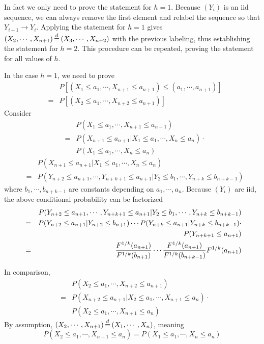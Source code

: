 \documentclass{report}
\begin{document}
\begin{enumerate}[1.]
\begin{enumerate}[(a)]
    In fact we only need to prove the statement for $h=1$. Because
    $(Y_i)$ is an iid sequence, we can always remove the first element
    and relabel the sequence so that $Y_{i+1} \to Y_{i}$. Applying the
    statement for $h=1$ gives $(X_2, \cdots, X_{n+1}) \ed (X_{3},
    \cdots, X_{n+2})$ with the previous labeling, thus establishing
    the statement for $h=2$. This procedure can be repeated, proving
    the statement for all values of $h$.

    In the case $h=1$, we need to prove
    \begin{eqnarray*}
      && P\left[(X_1 \le a_1, \cdots, X_{n+1} \le a_{n+1}) \le (a_1,
        \cdots, a_{n+1}) \right] \\
      &=& P\left[(X_2 \le a_1, \cdots, X_{n+2} \le a_{n+1}) \right]
    \end{eqnarray*}
    Consider
    \begin{eqnarray*}
      && P(X_1 \le a_1, \cdots, X_{n+1} \le a_{n+1}) \\
      &=& P(X_{n+1} \le a_{n+1} | X_1 \le a_1, \cdots, X_{n} \le
      a_{n}) \cdot \\
      && P(X_1 \le a_1, \cdots, X_{n} \le a_{n})
    \end{eqnarray*}
    \begin{eqnarray*}
      && P(X_{n+1} \le a_{n+1} | X_1 \le a_1, \cdots, X_{n} \le
      a_{n}) \\
      &=& P(Y_{n+2} \le a_{n+1}, \cdots, Y_{n+k+1} \le a_{n+1} | Y_2
      \le b_1, \cdots, Y_{n+k} \le b_{n+k-1})
    \end{eqnarray*}
    where $b_1, \cdots, b_{n+k-1}$ are constants depending on $a_1,
    \cdots, a_n$. Because $(Y_i)$ are iid, the above conditional
    probability can be factorized
    \begin{eqnarray*}
      && P(Y_{n+2} \le a_{n+1}, \cdots, Y_{n+k+1} \le a_{n+1} | Y_2
      \le b_1, \cdots, Y_{n+k} \le b_{n+k-1}) \\
      &=& P(Y_{n+2} \le a_{n+1} | Y_{n+2} \le b_{n+1}) \cdots
      P(Y_{n+k} \le a_{n+1} | Y_{n+k} \le b_{n+k-1}) \cdot \\
      && P(Y_{n+k+1} \le a_{n+1}) \\
      &=& {F^{1/k}(a_{n+1}) \over F^{1/k}(b_{n+1})} \cdots
      {F^{1/k}(a_{n+1}) \over F^{1/k}(b_{n+k-1})} F^{1/k}(a_{n+1})
    \end{eqnarray*}
    
    In comparison,
    \begin{eqnarray*}
      && P(X_2 \le a_1, \cdots, X_{n+2} \le a_{n+1}) \\
      &=& P(X_{n+2} \le a_{n+1} | X_2 \le a_1, \cdots, X_{n+1} \le
      a_{n}) \cdot \\
      && P(X_2 \le a_1, \cdots, X_{n+1} \le a_{n})
    \end{eqnarray*}
    By assumption, $(X_2, \cdots, X_{n+1}) \ed (X_1, \cdots, X_{n})$,
    meaning
    \[
    P(X_2 \le a_1, \cdots, X_{n+1} \le a_{n}) = P(X_1 \le
    a_1, \cdots, X_{n} \le a_{n})
    \]
    


\end{enumerate}
\end{enumerate}
\end{document}
